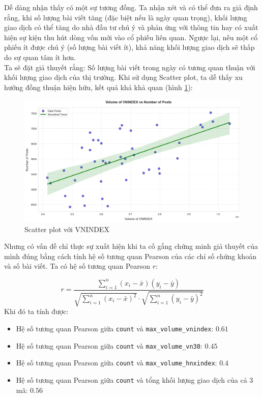 Dễ dàng nhận thấy có một sự tương đồng. Ta nhận xét và có thể đưa ra giả định rằng, khi số lượng bài viết tăng (đặc biệt nếu là ngày quan trọng), khối lượng giao dịch có thể tăng do nhà đầu tư chú ý và phản ứng với thông tin hay có xuất hiện sự kiện thu hút dòng vốn mới vào cổ phiếu liên quan. Ngược lại, nếu một cổ phiếu ít được chú ý (số lượng bài viết ít), khả năng khối lượng giao dịch sẽ thấp do sự quan tâm ít hơn.\\

Ta sẽ đặt giả thuyết rằng: Số lượng bài viết trong ngày có tương quan thuận với khối lượng giao dịch của thị trường.
Khi sử dụng Scatter plot, ta dễ thấy xu hướng đồng thuận hiện hữu, kết quả khá khả quan (hình \ref{fig:4.1}):\\

\begin{figure}[ht]
    \centering
        \includegraphics[width=0.75\linewidth]{images/plot-2.8-scatter_plot_smooth.png}
    \caption{Scatter plot với VNINDEX}
    \label{fig:4.1}
\end{figure}

Nhưng có vấn đề chỉ thực sự xuất hiện khi ta cố gắng chứng minh giả thuyết của mình đúng bằng cách tính hệ số tương quan Pearson của các chỉ số chứng khoán và số bài viết. Ta có hệ số tương quan Pearson $r$:

\[
r = \frac{\sum_{i=1}^n (x_i - \bar{x})(y_i - \bar{y})}{\sqrt{\sum_{i=1}^n (x_i - \bar{x})^2} \cdot \sqrt{\sum_{i=1}^n (y_i - \bar{y})^2}}
\]
Khi đó ta tính được:
\begin{itemize}
    \item Hệ số tương quan Pearson giữa \texttt{count} và \texttt{max\_volume\_vnindex}: $0.61$
    \item Hệ số tương quan Pearson giữa \texttt{count} và \texttt{max\_volume\_vn30}: $0.45$
    \item Hệ số tương quan Pearson giữa \texttt{count} và \texttt{max\_volume\_hnxindex}: $0.4$
    \item Hệ số tương quan Pearson giữa \texttt{count} và tổng khối lượng giao dịch của cả 3 mã: $0.56$
\end{itemize}

